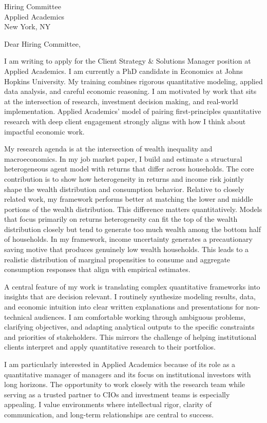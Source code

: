 \documentclass[11pt]{letter}
\begin{document}
\begin{letter}{Hiring Committee \\ Applied Academics \\ New York, NY}

\opening{Dear Hiring Committee,}

I am writing to apply for the Client Strategy \& Solutions Manager position at Applied Academics. I am currently a PhD candidate in Economics at Johns Hopkins University. My training combines rigorous quantitative modeling, applied data analysis, and careful economic reasoning. I am motivated by work that sits at the intersection of research, investment decision making, and real-world implementation. Applied Academics’ model of pairing first-principles quantitative research with deep client engagement strongly aligns with how I think about impactful economic work.

My research agenda is at the intersection of wealth inequality and macroeconomics. In my job market paper, I build and estimate a structural heterogeneous agent model with returns that differ across households. The core contribution is to show how heterogeneity in returns and income risk jointly shape the wealth distribution and consumption behavior. Relative to closely related work, my framework performs better at matching the lower and middle portions of the wealth distribution. This difference matters quantitatively. Models that focus primarily on returns heterogeneity can fit the top of the wealth distribution closely but tend to generate too much wealth among the bottom half of households. In my framework, income uncertainty generates a precautionary saving motive that produces genuinely low wealth households. This leads to a realistic distribution of marginal propensities to consume and aggregate consumption responses that align with empirical estimates.

A central feature of my work is translating complex quantitative frameworks into insights that are decision relevant. I routinely synthesize modeling results, data, and economic intuition into clear written explanations and presentations for non-technical audiences. I am comfortable working through ambiguous problems, clarifying objectives, and adapting analytical outputs to the specific constraints and priorities of stakeholders. This mirrors the challenge of helping institutional clients interpret and apply quantitative research to their portfolios.

I am particularly interested in Applied Academics because of its role as a quantitative manager of managers and its focus on institutional investors with long horizons. The opportunity to work closely with the research team while serving as a trusted partner to CIOs and investment teams is especially appealing. I value environments where intellectual rigor, clarity of communication, and long-term relationships are central to success.


\end{letter}
\end{document}
